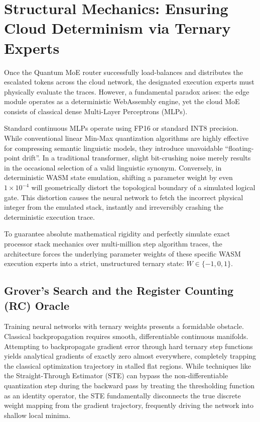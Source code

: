 \documentclass[11pt,a4paper]{article}
\begin{document}
\section{Structural Mechanics: Ensuring Cloud Determinism via Ternary Experts}

Once the Quantum MoE router successfully load-balances and distributes the escalated tokens across the cloud network, the designated execution experts must physically evaluate the traces. However, a fundamental paradox arises: the edge module operates as a deterministic WebAssembly engine, yet the cloud MoE consists of classical dense Multi-Layer Perceptrons (MLPs).

Standard continuous MLPs operate using FP16 or standard INT8 precision. While conventional linear Min-Max quantization algorithms are highly effective for compressing semantic linguistic models, they introduce unavoidable ``floating-point drift''. In a traditional transformer, slight bit-crushing noise merely results in the occasional selection of a valid linguistic synonym. Conversely, in deterministic WASM state emulation, shifting a parameter weight by even $1 \times 10^{-4}$ will geometrically distort the topological boundary of a simulated logical gate. This distortion causes the neural network to fetch the incorrect physical integer from the emulated stack, instantly and irreversibly crashing the deterministic execution trace.

To guarantee absolute mathematical rigidity and perfectly simulate exact processor stack mechanics over multi-million step algorithm traces, the architecture forces the underlying parameter weights of these specific WASM execution experts into a strict, unstructured ternary state: $W \in \{-1, 0, 1\}$.

\subsection{Grover's Search and the Register Counting (RC) Oracle}

Training neural networks with ternary weights presents a formidable obstacle. Classical backpropagation requires smooth, differentiable continuous manifolds. Attempting to backpropagate gradient error through hard ternary step functions yields analytical gradients of exactly zero almost everywhere, completely trapping the classical optimization trajectory in stalled flat regions. While techniques like the Straight-Through Estimator (STE) can bypass the non-differentiable quantization step during the backward pass by treating the thresholding function as an identity operator, the STE fundamentally disconnects the true discrete weight mapping from the gradient trajectory, frequently driving the network into shallow local minima.
\end{document}
